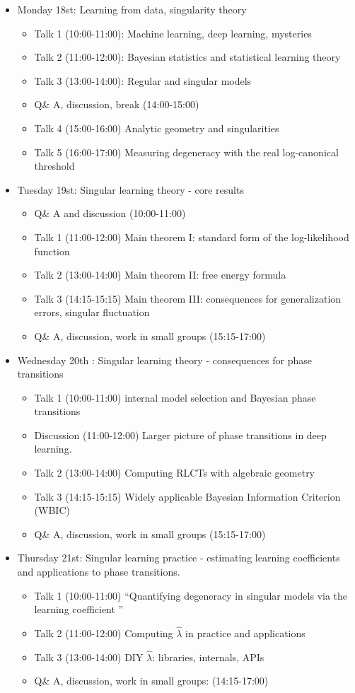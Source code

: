 \documentclass[a4paper,11pt]{amsart}
\newcommand{\lambdahat}{\widehat{\lambda}}
\begin{document}
\begin{itemize}
\item Monday 18st: Learning from data, singularity theory
  \begin{itemize}
  \item Talk 1 (10:00-11:00): Machine learning, deep learning, mysteries
  \item Talk 2 (11:00-12:00): Bayesian statistics and statistical learning theory
  \item Talk 3 (13:00-14:00): Regular and singular models
  \item Q\& A, discussion, break (14:00-15:00)
  \item Talk 4 (15:00-16:00) Analytic geometry and singularities
  \item Talk 5 (16:00-17:00) Measuring degeneracy with the real log-canonical threshold  
  \end{itemize}
\item Tuesday 19st: Singular learning theory - core results
  \begin{itemize}
  \item Q\& A and discussion (10:00-11:00)
  \item Talk 1 (11:00-12:00) Main theorem I: standard form of the log-likelihood function
  \item Talk 2 (13:00-14:00) Main theorem II: free energy formula
  \item Talk 3 (14:15-15:15) Main theorem III: consequences for generalization errors, singular fluctuation
  \item Q\& A, discussion, work in small groups (15:15-17:00)  
  \end{itemize}
\item Wednesday 20th : Singular learning theory - consequences for phase transitions  
  \begin{itemize}
  \item Talk 1 (10:00-11:00) internal model selection and Bayesian phase transitions
  \item Discussion (11:00-12:00) Larger picture of phase transitions in deep learning.
  \item Talk 2 (13:00-14:00) Computing RLCTs with algebraic geometry
  \item Talk 3 (14:15-15:15) Widely applicable Bayesian Information Criterion (WBIC)
  \item Q\& A, discussion, work in small groups (15:15-17:00)
  \end{itemize}
\item Thursday 21st: Singular learning practice - estimating learning coefficients and applications to phase transitions.
  \begin{itemize}
  \item Talk 1 (10:00-11:00) ``Quantifying degeneracy in singular models via the learning coefficient ''
  \item Talk 2 (11:00-12:00) Computing $\lambdahat$ in practice and applications
  \item Talk 3 (13:00-14:00) DIY $\lambdahat$: libraries, internals, APIs
  \item Q\& A, discussion, work in small groups: (14:15-17:00)
  \end{itemize}
\end{itemize}
\end{document}
